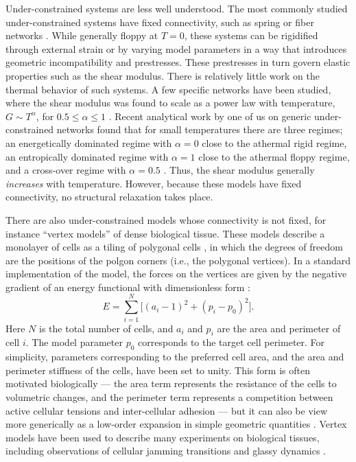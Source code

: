 \documentclass[aps,reprint,superscriptaddress,nofootinbib, notitlepage,prl]{revtex4-2}
\begin{document}
Under-constrained systems are less well understood.
The most commonly studied under-constrained systems have fixed connectivity, such as spring or fiber networks \cite{Merkel2019,chen2024field,broedersz2011criticality}.
While generally floppy at $T=0$, these systems can be rigidified through external strain or by varying model parameters in a way that introduces geometric incompatibility and prestresses.
These prestresses in turn govern elastic properties such as the shear modulus.
There is relatively little work on the thermal behavior of such systems.
A few specific networks have been studied, where the shear modulus was found to scale as a power law with temperature, $G\sim T^\alpha$, for $0.5\leq \alpha \leq 1$ \cite{mao2015mechanical,zhang2016finite}.
Recent analytical work by one of us on generic under-constrained networks found that for small temperatures there are three regimes; an energetically dominated regime with $\alpha=0$ close to the athermal rigid regime, an entropically dominated regime with $\alpha=1$ close to the athermal floppy regime, and a cross-over regime with $\alpha=0.5$ \cite{lee2023generic,lee2023partition}.
Thus, the shear modulus generally \emph{increases} with temperature.
However, because these models have fixed connectivity, no structural relaxation takes place.


There are also under-constrained models whose connectivity is not fixed, for instance ``vertex models'' of dense biological tissue.
These models describe a monolayer of cells as a tiling of polygonal cells \cite{farhadifar2007influence,alt2017vertex,honda1983geometrical}, in which the degrees of freedom are the positions of the polgon corners (i.e., the polygonal vertices).
In a standard implementation of the model, the forces on the vertices are given by the negative gradient of an energy functional with dimensionless form \cite{farhadifar2007influence}:
\begin{equation}\label{eq:cellenergyReduced} 
	E = \sum_{i=1}^{N}\Big[(a_i-1)^2 + (p_i-p_0)^2\Big].
\end{equation}
Here $N$ is the total number of cells, and $a_i$ and $p_i$ are the area and perimeter of cell $i$.
The model parameter $p_0$ corresponds to the target cell perimeter.
For simplicity, parameters corresponding to the preferred cell area, and the area and perimeter stiffness of the cells, have been set to unity.
This form is often motivated biologically --- the area term represents the resistance of the cells to volumetric changes, and the perimeter term represents a competition between active cellular tensions and inter-cellular adhesion \cite{honda1983geometrical,farhadifar2007influence} --- but it can also be view more generically as a low-order expansion in simple geometric quantities \cite{kim2018universal}.
Vertex models have been used to describe many experiments on biological tissues, including observations of cellular jamming transitions and glassy dynamics \cite{schoetz2013glassy,angelini2011glass,sadati2013collective,park2016collective,oswald2017jamming,park2015unjamming,garcia2015physics,tang2022collective,devany2021cell,grosser2021cell}.
\end{document}
